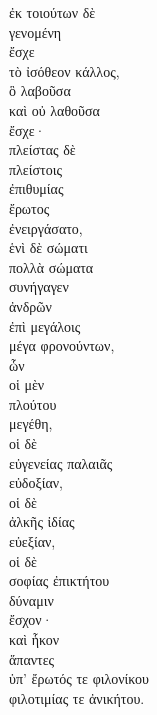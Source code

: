 {\large
\begin{greek}
\noindent ἐκ τοιούτων δὲ \\
γενομένη \\
ἔσχε \\
τὸ ἰσόθεον κάλλος, \\
\tabto{2em} ὃ λαβοῦσα \\
\tabto{2em} καὶ οὐ λαθοῦσα \\
\tabto{2em} ἔσχε· \\
πλείστας δὲ \\
\tabto{2em} πλείστοις \\
ἐπιθυμίας \\
\tabto{2em} ἔρωτος \\
ἐνειργάσατο, \\
ἑνὶ δὲ σώματι \\
πολλὰ σώματα \\
συνήγαγεν \\
\tabto{2em} ἀνδρῶν \\
ἐπὶ μεγάλοις \\
\tabto{2em} μέγα φρονούντων, \\
\tabto{4em} ὧν \\
\tabto{4em} οἱ μὲν \\
\tabto{6em} πλούτου \\
\tabto{4em} μεγέθη, \\
\tabto{4em} οἱ δὲ \\
\tabto{6em} εὐγενείας παλαιᾶς \\
\tabto{4em} εὐδοξίαν, \\
\tabto{4em} οἱ δὲ \\
\tabto{6em} ἀλκῆς ἰδίας \\
\tabto{4em} εὐεξίαν, \\
\tabto{4em} οἱ δὲ \\
\tabto{6em} σοφίας ἐπικτήτου \\
\tabto{4em} δύναμιν \\
\tabto{4em} ἔσχον· \\
\tabto{4em} καὶ ἧκον \\
\tabto{4em} ἅπαντες \\
\tabto{6em} ὑπ' ἔρωτός τε φιλονίκου \\
\tabto{6em} φιλοτιμίας τε ἀνικήτου.\\

\end{greek}
}

